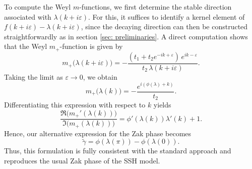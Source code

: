 \documentclass[a4paper,reqno,twoside]{amsart}
\numberwithin{equation}{section}
\theoremstyle{definition}
\renewcommand{\tilde}{\widetilde}
\newcommand{\<}{\ensuremath \leq}
\renewcommand{\>}{\ensuremath \geq}
\renewcommand{\epsilon}{\varepsilon}
\renewcommand{\tilde}{\widetilde}
\begin{document}
To compute the Weyl $m$-functions, we first determine the stable direction associated with
$\lambda(k+i\epsilon)$. For this, it suffices to identify a kernel element of
$f(k+i\epsilon)-\lambda(k+i\epsilon)$, since the decaying direction can then be constructed
straightforwardly as in section \ref{sec: preliminaries}. A direct computation shows that the Weyl $m_+$-function is given by
\begin{equation}
    m_+\bigl(\lambda(k+i\epsilon)\bigr)
    =
    -\frac{(t_1+t_2 e^{-ik+\epsilon})\,e^{ik-\epsilon}}
         {t_2\,\lambda(k+i\epsilon)}.
\end{equation}
Taking the limit as $\epsilon\to0$, we obtain
\begin{equation}
    m_+\bigl(\lambda(k)\bigr)
    =
    -\frac{e^{i(\phi(\lambda)+k)}}{t_2}.
\end{equation}
Differentiating this expression with respect to $k$ yields
\begin{equation}
    \frac{\Re\bigl(m_+'(\lambda(k))\bigr)}
         {\Im\bigl(m_+(\lambda(k))\bigr)}
    =
    \phi'(\lambda(k))\lambda'(k)+1.
\end{equation}
Hence, our alternative expression for the Zak phase becomes
\begin{equation}
    \tilde{\gamma}
    =
    \phi(\lambda(\pi))-\phi(\lambda(0)).
\end{equation}
Thus, this formulation is fully consistent with the standard approach and reproduces the
usual Zak phase of the SSH model.
\end{document}
